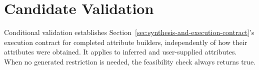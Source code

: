 \section{Candidate Validation}
\label{sec:candidate-validation}
Conditional validation establishes Section~\ref{sec:synthesis-and-execution-contract}'s execution
contract for completed attribute builders, independently of how their
attributes were obtained. It applies to inferred and user-supplied
attributes. When no generated restriction is needed, the feasibility
check always returns true.


